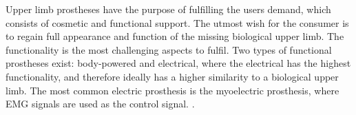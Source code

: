 
Upper limb prostheses have the purpose of fulfilling the users demand, which consists of cosmetic and functional support. The utmost wish for the consumer is to regain full appearance and function of the missing biological upper limb. The functionality is the most challenging aspects to fulfil. Two types of functional prostheses exist: body-powered and electrical, where the electrical has the highest functionality, and therefore ideally has a higher similarity to a biological upper limb. The most common electric prosthesis is the myoelectric prosthesis, where EMG signals are used as the control signal. \cite{jiang2012}. 

